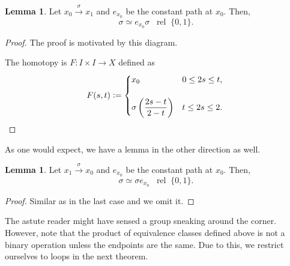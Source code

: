 \documentclass[12pt]{article}
\theoremstyle{definition}
\numberwithin{thm}{section}
\newtheorem{lem}[thm]{Lemma}
\newcommand{\rel}{\;\;\operatorname{rel}\;}
\begin{document}
\begin{lem} \label{lem:leftid}
	Let $x_0 \overset{\sigma}{\longrightarrow} x_1$ and $e_{x_0}$ be the constant path at $x_0.$ Then,
	\begin{equation*} 
		\sigma \simeq e_{x_0}\sigma \rel \{0, 1\}.
	\end{equation*}
\end{lem}
\begin{proof} 
	The proof is motivated by this diagram.

	\begin{center}
	\end{center}

	The homotopy is $F:I\times I \to X$ defined as
	\begin{equation*} 
		F(s, t) \vcentcolon= \begin{cases}
			x_0 & 0 \le 2s \le t,\\~\\
    	\sigma\left(\dfrac{2s - t}{2 - t}\right) & t \le 2s \le 2.
		\end{cases}
		\qedhere
	\end{equation*}
\end{proof}

As one would expect, we have a lemma in the other direction as well.
\begin{lem} \label{lem:rightid}
	Let $x_1 \overset{\sigma}{\longrightarrow} x_0$ and $e_{x_0}$ be the constant path at $x_0.$ Then,
	\begin{equation*} 
		\sigma \simeq \sigma e_{x_0} \rel \{0, 1\}.
	\end{equation*}
\end{lem}

\begin{proof} 
	Similar as in the last case and we omit it.
\end{proof}
	
The astute reader might have sensed a group sneaking around the corner.\\
However, note that the product of equivalence classes defined above is not a binary operation unless the endpoints are the same. Due to this, we restrict ourselves to loops in the next theorem.
\end{document}
